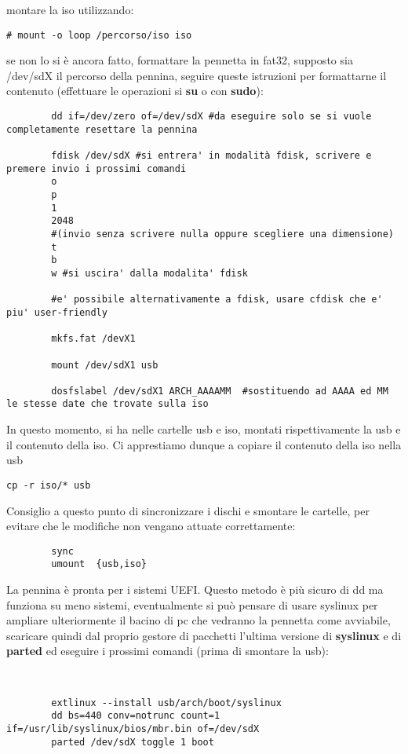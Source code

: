 \documentclass[twoside,italian]{book}
\newcommand{\nlinea}{
	\leavevmode
	\\
}
\newcommand{\centcode}[1]{
	
	\definecolor{centcode}{rgb}{0.5,0.1,0.1}
	
	\begin{center}
	 	\texttt{\textcolor{centcode}{#1}}
	\end{center}
	
	
}
\begin{document}
			montare la iso utilizzando: \centcode{\# mount -o loop /percorso/iso iso}

			se non lo si è ancora fatto, formattare la pennetta in fat32, supposto sia /dev/sdX il percorso della pennina, seguire queste istruzioni per formattarne il contenuto (effettuare le operazioni si \textbf{su} o con \textbf{sudo}):\\


\begin{lstlisting}
		dd if=/dev/zero of=/dev/sdX #da eseguire solo se si vuole completamente resettare la pennina

		fdisk /dev/sdX #si entrera' in modalità fdisk, scrivere e premere invio i prossimi comandi
		o
		p
		1
		2048
		#(invio senza scrivere nulla oppure scegliere una dimensione)
		t
		b
		w #si uscira' dalla modalita' fdisk

		#e' possibile alternativamente a fdisk, usare cfdisk che e' piu' user-friendly

		mkfs.fat /devX1

		mount /dev/sdX1 usb

		dosfslabel /dev/sdX1 ARCH_AAAAMM  #sostituendo ad AAAA ed MM le stesse date che trovate sulla iso
\end{lstlisting}



			In questo momento, si ha nelle cartelle usb e iso, montati rispettivamente la usb e il contenuto della iso. Ci apprestiamo dunque a copiare il contenuto della iso nella usb

			\centcode{cp -r iso/* usb}

			Consiglio a questo punto di sincronizzare  i dischi e smontare le cartelle, per evitare che le modifiche non vengano attuate correttamente:

\begin{lstlisting}
		sync
		umount  {usb,iso}
\end{lstlisting}



			La pennina è pronta per i sistemi UEFI. Questo metodo è più sicuro di dd ma funziona su meno sistemi, eventualmente si può pensare di usare syslinux per ampliare ulteriormente il bacino di pc che vedranno la pennetta come avviabile, scaricare quindi dal proprio gestore di pacchetti l'ultima versione di \textbf{syslinux} e di \textbf{parted} ed eseguire i prossimi comandi (prima di smontare la usb):

\nlinea
\begin{lstlisting}
		extlinux --install usb/arch/boot/syslinux
		dd bs=440 conv=notrunc count=1 if=/usr/lib/syslinux/bios/mbr.bin of=/dev/sdX
		parted /dev/sdX toggle 1 boot
\end{lstlisting}
\end{document}
